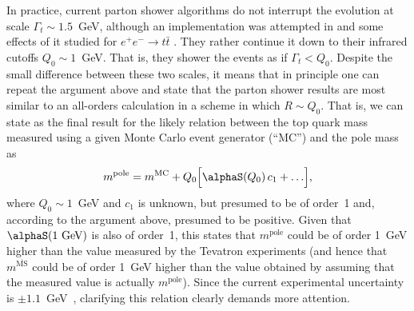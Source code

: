 In practice, current parton shower algorithms do not interrupt the
evolution at scale $\Gamma_t\sim1.5$~GeV, although an implementation was
attempted in \pythiasix and some effects of it studied for $e^+e^-\to
t\bar{t}$ \cite{Khoze:1994fu}.  They rather continue it down to
their infrared cutoffs $Q_0\sim1$~GeV.  That is, they shower the events
as if $\Gamma_t<Q_0$.  Despite the small difference between these two
scales, it means that in principle one can repeat the argument above and
state that the parton shower results are most similar to an all-orders
calculation in a scheme in which $R\sim Q_0$.  That is, we can state as
the final result for the likely relation between the top quark mass
measured using a given Monte Carlo event generator (``MC'') and the pole
mass as~\cite{Hoang:2008xm}
\begin{equation}
  m^{\mathrm{pole}} = m^{\mathrm{MC}}+Q_0\Bigl[\alphaS(Q_0)\,c_1+\ldots\Bigr],
\end{equation}
where $Q_0\sim1$~GeV and $c_1$ is unknown, but presumed to be of
order~1 and, according to the argument above, presumed to be positive.
Given that $\alphaS(\mbox{1~GeV})$ is also of order~1, this
states that $m^{\mathrm{pole}}$ could be of order 1~GeV higher than the
value measured by the Tevatron experiments (and hence that
$m^{\overline{\mathrm{MS}}}$ could be of order 1~GeV higher than the
value obtained by assuming that the measured value is actually
$m^{\mathrm{pole}}$).  Since the current experimental uncertainty is
$\pm1.1$~GeV~\cite{:1900yx},
clarifying this relation clearly demands more attention.

